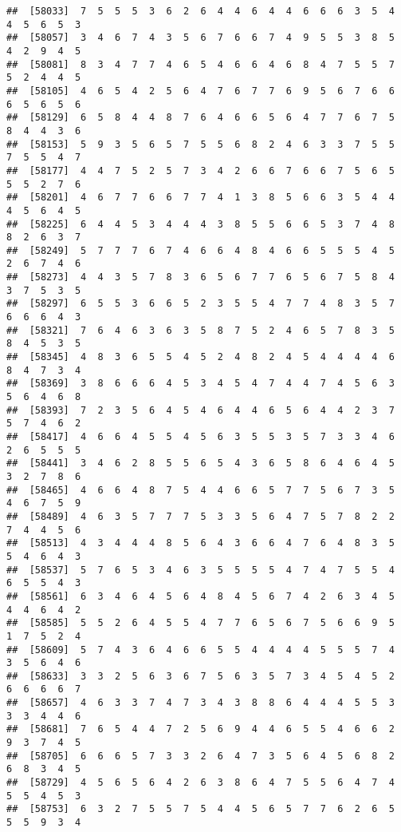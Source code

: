 \documentclass[
]{book}
\begin{document}
\begin{verbatim}
##  [58033]  7  5  5  5  3  6  2  6  4  4  6  4  4  6  6  6  3  5  4  4  5  6  5  3
##  [58057]  3  4  6  7  4  3  5  6  7  6  6  7  4  9  5  5  3  8  5  4  2  9  4  5
##  [58081]  8  3  4  7  7  4  6  5  4  6  6  4  6  8  4  7  5  5  7  5  2  4  4  5
##  [58105]  4  6  5  4  2  5  6  4  7  6  7  7  6  9  5  6  7  6  6  6  5  6  5  6
##  [58129]  6  5  8  4  4  8  7  6  4  6  6  5  6  4  7  7  6  7  5  8  4  4  3  6
##  [58153]  5  9  3  5  6  5  7  5  5  6  8  2  4  6  3  3  7  5  5  7  5  5  4  7
##  [58177]  4  4  7  5  2  5  7  3  4  2  6  6  7  6  6  7  5  6  5  5  5  2  7  6
##  [58201]  4  6  7  7  6  6  7  7  4  1  3  8  5  6  6  3  5  4  4  4  5  6  4  5
##  [58225]  6  4  4  5  3  4  4  4  3  8  5  5  6  6  5  3  7  4  8  8  2  6  3  7
##  [58249]  5  7  7  7  6  7  4  6  6  4  8  4  6  6  5  5  5  4  5  2  6  7  4  6
##  [58273]  4  4  3  5  7  8  3  6  5  6  7  7  6  5  6  7  5  8  4  3  7  5  3  5
##  [58297]  6  5  5  3  6  6  5  2  3  5  5  4  7  7  4  8  3  5  7  6  6  6  4  3
##  [58321]  7  6  4  6  3  6  3  5  8  7  5  2  4  6  5  7  8  3  5  8  4  5  3  5
##  [58345]  4  8  3  6  5  5  4  5  2  4  8  2  4  5  4  4  4  4  6  8  4  7  3  4
##  [58369]  3  8  6  6  6  4  5  3  4  5  4  7  4  4  7  4  5  6  3  5  6  4  6  8
##  [58393]  7  2  3  5  6  4  5  4  6  4  4  6  5  6  4  4  2  3  7  5  7  4  6  2
##  [58417]  4  6  6  4  5  5  4  5  6  3  5  5  3  5  7  3  3  4  6  2  6  5  5  5
##  [58441]  3  4  6  2  8  5  5  6  5  4  3  6  5  8  6  4  6  4  5  3  2  7  8  6
##  [58465]  4  6  6  4  8  7  5  4  4  6  6  5  7  7  5  6  7  3  5  4  6  7  5  9
##  [58489]  4  6  3  5  7  7  7  5  3  3  5  6  4  7  5  7  8  2  2  7  4  4  5  6
##  [58513]  4  3  4  4  4  8  5  6  4  3  6  6  4  7  6  4  8  3  5  5  4  6  4  3
##  [58537]  5  7  6  5  3  4  6  3  5  5  5  5  4  7  4  7  5  5  4  6  5  5  4  3
##  [58561]  6  3  4  6  4  5  6  4  8  4  5  6  7  4  2  6  3  4  5  4  4  6  4  2
##  [58585]  5  5  2  6  4  5  5  4  7  7  6  5  6  7  5  6  6  9  5  1  7  5  2  4
##  [58609]  5  7  4  3  6  4  6  6  5  5  4  4  4  4  5  5  5  7  4  3  5  6  4  6
##  [58633]  3  3  2  5  6  3  6  7  5  6  3  5  7  3  4  5  4  5  2  6  6  6  6  7
##  [58657]  4  6  3  3  7  4  7  3  4  3  8  8  6  4  4  4  5  5  3  3  3  4  4  6
##  [58681]  7  6  5  4  4  7  2  5  6  9  4  4  6  5  5  4  6  6  2  9  3  7  4  5
##  [58705]  6  6  6  5  7  3  3  2  6  4  7  3  5  6  4  5  6  8  2  6  8  3  4  5
##  [58729]  4  5  6  5  6  4  2  6  3  8  6  4  7  5  5  6  4  7  4  5  5  4  5  3
##  [58753]  6  3  2  7  5  5  7  5  4  4  5  6  5  7  7  6  2  6  5  5  5  9  3  4

\end{verbatim}
\end{document}
